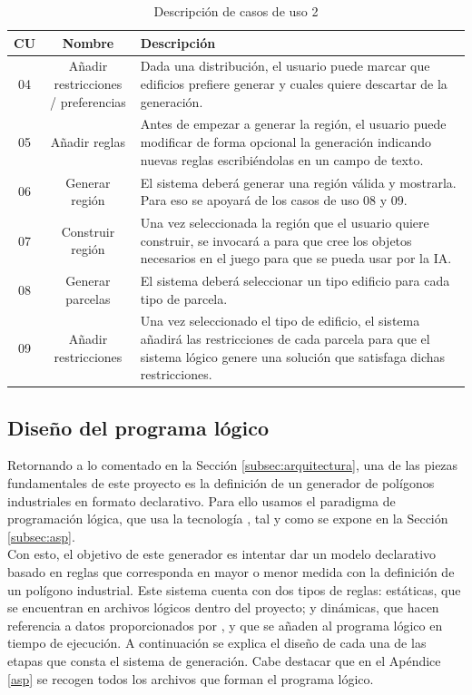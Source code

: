 \begin{table}[!h]
	\begin{tabularx}{\textwidth}{ c c X }
		\bfseries{CU} & \bfseries{Nombre} & \bfseries{Descripción} \\
		\hline
		04 & \makecell{Añadir restricciones \\ / preferencias} & Dada una distribución, el usuario puede marcar que edificios prefiere generar y cuales quiere descartar de la generación. \\
		\hline
		05 & Añadir reglas & Antes de empezar a generar la región, el usuario puede modificar de forma opcional la generación indicando nuevas reglas escribiéndolas en un campo de texto. \\
		\hline
		06 & Generar región & El sistema deberá generar una región válida y mostrarla. Para eso se apoyará de los casos de uso 08 y 09. \\
		\hline
		07 & Construir región & Una vez seleccionada la región que el usuario quiere construir, se invocará a \cities para que cree los objetos necesarios en el juego para que se pueda usar por la IA. \\
		\hline
		08 & Generar parcelas & El sistema deberá seleccionar un tipo edificio para cada tipo de parcela. \\
		\hline
		09 & Añadir restricciones & Una vez seleccionado el tipo de edificio, el sistema añadirá las restricciones de cada parcela para que el sistema lógico genere una solución que satisfaga dichas restricciones. \\
		\hline
	\end{tabularx}
	\caption{Descripción de casos de uso 2}
	\label{table:casos-uso2}
\end{table}

\subsection{Diseño del programa lógico}
\label{subsubsec:generator}

Retornando a lo comentado en la Sección \ref{subsec:arquitectura}, una de las piezas fundamentales de este proyecto es la definición de un generador de polígonos industriales en formato declarativo. Para ello usamos el paradigma de programación lógica, que usa la tecnología \asp, tal y como se expone en la Sección \ref{subsec:asp}. \\

Con esto, el objetivo de este generador es intentar dar un modelo declarativo basado en reglas que corresponda en mayor o menor medida con la definición de un polígono industrial. Este sistema cuenta con dos tipos de reglas: estáticas, que se encuentran en archivos lógicos dentro del proyecto; y dinámicas, que hacen referencia a datos proporcionados por \cities, y que se añaden al programa lógico en tiempo de ejecución. A continuación se explica el diseño de cada una de las etapas que consta el sistema de generación. Cabe destacar que en el Apéndice \ref{asp} se recogen todos los archivos que forman el programa lógico.

